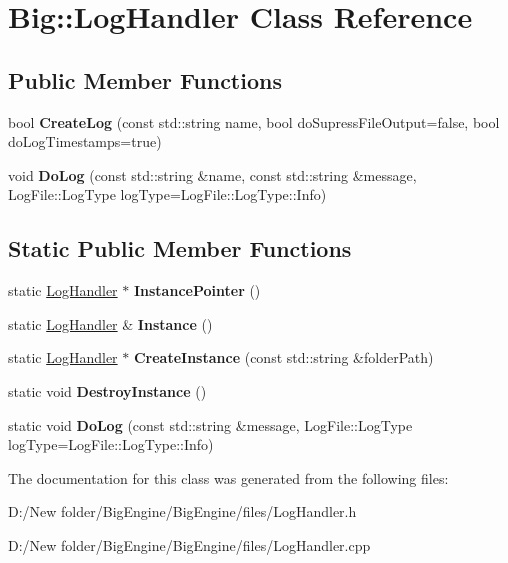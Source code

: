 \hypertarget{class_big_1_1_log_handler}{}\section{Big\+:\+:Log\+Handler Class Reference}
\label{class_big_1_1_log_handler}
\subsection*{Public Member Functions}
\begin{DoxyCompactItemize}
\item 
\mbox{\label{class_big_1_1_log_handler_ae0280e5a3984b82bbbb209238f4fd051}} 
bool {\bfseries Create\+Log} (const std\+::string name, bool do\+Supress\+File\+Output=false, bool do\+Log\+Timestamps=true)
\item 
\mbox{\label{class_big_1_1_log_handler_a1c52c665f1cc70af1b3bb785e9a6cd07}} 
void {\bfseries Do\+Log} (const std\+::string \&name, const std\+::string \&message, Log\+File\+::\+Log\+Type log\+Type=Log\+File\+::\+Log\+Type\+::\+Info)
\end{DoxyCompactItemize}
\subsection*{Static Public Member Functions}
\begin{DoxyCompactItemize}
\item 
\mbox{\label{class_big_1_1_log_handler_a036677bf2edf39362b8fb1c1a277c2fb}} 
static \mbox{\hyperlink{class_big_1_1_log_handler}{Log\+Handler}} $\ast$ {\bfseries Instance\+Pointer} ()
\item 
\mbox{\label{class_big_1_1_log_handler_a250d2bf39dab252fc7f452fd50966fb0}} 
static \mbox{\hyperlink{class_big_1_1_log_handler}{Log\+Handler}} \& {\bfseries Instance} ()
\item 
\mbox{\label{class_big_1_1_log_handler_a840dc5609c9aafb5576c7333e5dcd8f5}} 
static \mbox{\hyperlink{class_big_1_1_log_handler}{Log\+Handler}} $\ast$ {\bfseries Create\+Instance} (const std\+::string \&folder\+Path)
\item 
\mbox{\label{class_big_1_1_log_handler_a89496e43cb475168a502e660db0321f3}} 
static void {\bfseries Destroy\+Instance} ()
\item 
\mbox{\label{class_big_1_1_log_handler_aa7314e28ae8880caf29de884f2b2e3bf}} 
static void {\bfseries Do\+Log} (const std\+::string \&message, Log\+File\+::\+Log\+Type log\+Type=Log\+File\+::\+Log\+Type\+::\+Info)
\end{DoxyCompactItemize}


The documentation for this class was generated from the following files\+:\begin{DoxyCompactItemize}
\item 
D\+:/\+New folder/\+Big\+Engine/\+Big\+Engine/files/Log\+Handler.\+h\item 
D\+:/\+New folder/\+Big\+Engine/\+Big\+Engine/files/Log\+Handler.\+cpp\end{DoxyCompactItemize}
